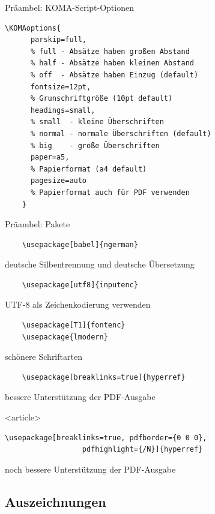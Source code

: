 \begin{Frame}[fragile]{Präambel: KOMA-Script-Optionen}
  \begin{lstlisting}[gobble=4]
    \KOMAoptions{
      parskip=full,
      % full - Absätze haben großen Abstand
      % half - Absätze haben kleinen Abstand
      % off  - Absätze haben Einzug (default)
      fontsize=12pt,
      % Grunschriftgröße (10pt default)
      headings=small,
      % small  - kleine Überschriften
      % normal - normale Überschriften (default)
      % big    - große Überschriften
      paper=a5,
      % Papierformat (a4 default)
      pagesize=auto
      % Papierformat auch für PDF verwenden
    }
  \end{lstlisting}
\end{Frame}

\begin{Frame}[fragile]{Präambel: Pakete}
  \begin{lstlisting}
    \usepackage[babel]{ngerman}
  \end{lstlisting}
  deutsche Silbentrennung und deutsche Übersetzung
  \begin{lstlisting}
    \usepackage[utf8]{inputenc}
  \end{lstlisting}
  UTF-8 als Zeichenkodierung verwenden
  \begin{lstlisting}
    \usepackage[T1]{fontenc}
    \usepackage{lmodern}
  \end{lstlisting}
  schönere Schriftarten
  \begin{lstlisting}
    \usepackage[breaklinks=true]{hyperref}
  \end{lstlisting}
  bessere Unterstützung der PDF-Ausgabe
  \begin{onlyenv}<article>
    \begin{lstlisting}[gobble=6]
      \usepackage[breaklinks=true, pdfborder={0 0 0},
                  pdfhighlight={/N}]{hyperref}
    \end{lstlisting}
    noch bessere Unterstützung der PDF-Ausgabe
  \end{onlyenv}
\end{Frame}

\subsection{Auszeichnungen}

